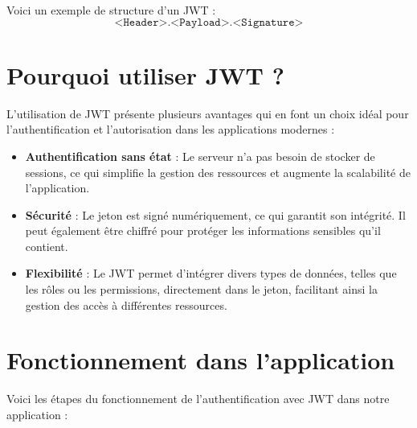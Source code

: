 Voici un exemple de structure d'un JWT :
\[
\texttt{<Header>.<Payload>.<Signature>}
\]

\section{Pourquoi utiliser JWT ?}

L'utilisation de JWT présente plusieurs avantages qui en font un choix idéal pour l'authentification et l'autorisation dans les applications modernes :
\begin{itemize}
    \item \textbf{Authentification sans état} : Le serveur n’a pas besoin de stocker de sessions, ce qui simplifie la gestion des ressources et augmente la scalabilité de l’application.
    \item \textbf{Sécurité} : Le jeton est signé numériquement, ce qui garantit son intégrité. Il peut également être chiffré pour protéger les informations sensibles qu'il contient.
    \item \textbf{Flexibilité} : Le JWT permet d'intégrer divers types de données, telles que les rôles ou les permissions, directement dans le jeton, facilitant ainsi la gestion des accès à différentes ressources.
\end{itemize}

\section{Fonctionnement dans l’application}

Voici les étapes du fonctionnement de l’authentification avec JWT dans notre application :

